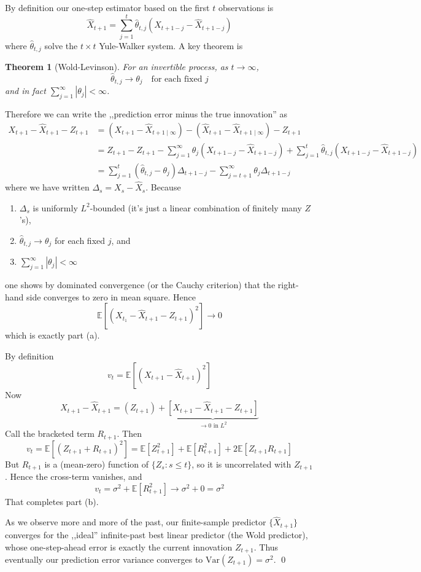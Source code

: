 \documentclass[11pt,a4paper]{article}
\newtheorem{theorem}{Theorem}
\newcommand{\EE}{\mathbb E}
\newcommand{\var}{\mathrm{Var}}
\begin{document}
    By definition our one-step estimator based on the first $t$ observations is
    \[ \hat X_{t+1} = \sum_{j=1}^t \hat \theta_{t,j} (X_{t+1-j} - \hat X_{t+1-j}) \]
    where $\hat \theta_{t,j}$ solve the $t\times t$ Yule-Walker system. A key theorem is
    \begin{theorem}[Wold-Levinson]
        For an invertible process, as $t\to \infty$, \[ \hat \theta_{t,j} \to \theta_j \quad \text{for each fixed } j \]
        and in fact $\sum_{j=1}^\infty |\theta_j| < \infty$.
    \end{theorem}
    Therefore we can write the ,,prediction error minus the true innovation'' as
    \begin{align*}
        X_{t+1} - \hat X_{t+1} - Z_{t+1} &= \left( X_{t+1} - \hat X_{t+1\mid \infty} \right) - \left( \hat X_{t+1} - \hat X_{t+1 \mid \infty} \right) - Z_{t+1} \\
        &= Z_{t+1} - Z_{t+1} - \sum_{j=1}^\infty \theta_j (X_{t+1-j} - \hat X_{t+1-j}) + \sum_{j=1}^t \hat \theta_{t,j} (X_{t+1-j} - \hat X_{t+1-j}) \\
        &= \sum_{j=1}^t (\hat \theta_{t,j} - \theta_j) \Delta_{t+1-j} - \sum_{j=t+1}^\infty \theta_j \Delta_{t+1-j}
    \end{align*}
    where we have written $\Delta_s = X_s - \hat X_s$. Because
    \begin{enumerate}
        \item $\Delta_s$ is uniformly $L^2$-bounded (it's just a linear combination of finitely many $Z$'s),
        \item $\hat \theta_{t,j} \to \theta_j$ for each fixed $j$, and
        \item $\sum_{j=1}^\infty |\theta_j| < \infty$
    \end{enumerate}
    one shows by dominated convergence (or the Cauchy criterion) that the right-hand side converges to zero in mean square. Hence
    \[ \EE[(X_{t_1} - \hat X_{t+1} - Z_{t+1})^2] \rightarrow 0 \]
    which is exactly part (a).

    By definition \[ v_t = \EE[(X_{t+1} - \hat X_{t+1})^2] \]
    Now \[ X_{t+1} - \hat X_{t+1} = (Z_{t+1}) + \underbrace{[X_{t+1} - \hat X_{t+1} - Z_{t+1}]}_{\to 0 \text{ in } L^2} \]
    Call the bracketed term $R_{t+1}$. Then
    \[ v_t = \EE[(Z_{t+1} + R_{t+1})^2] = \EE[Z_{t+1}^2] + \EE[{R_{t+1}^2}] + 2 \EE[Z_{t+1} R_{t+1}] \]
    But $R_{t+1}$ is a (mean-zero) function of $\{ Z_s \colon s \le t \}$, so it is uncorrelated with $Z_{t+1}$. Hence the cross-term vanishes, and \[ v_t = \sigma^2 + \EE[R_{t+1}^2] \rightarrow \sigma^2 + 0 = \sigma^2 \]
    That completes part (b).

    As we observe more and more of the past, our finite-sample predictor $\{\hat X_{t+1} \}$ converges for the ,,ideal'' infinite-past best linear predictor (the Wold predictor), whose one-step-ahead error is exactly the current innovation $Z_{t+1}$. Thus eventually our prediction error variance converges to $\var(Z_{t+1}) = \sigma^2$. \qed
\end{document}
